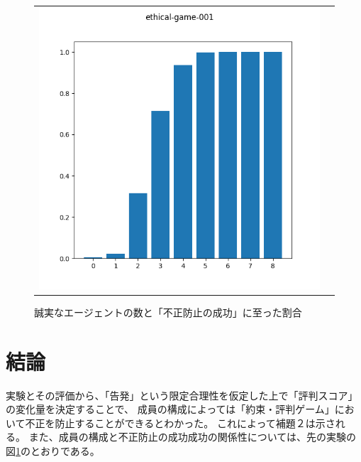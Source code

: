 \begin{figure}[h]
  \begin{tabular}{cc}
    \begin{minipage}[t]{1\hsize}
      \centering
      \includegraphics[keepaspectratio, width=1\linewidth]{./06_ethical-prgame/ethical-game-001.png}
      \caption{誠実なエージェントの数と「不正防止の成功」に至った割合}
      \label{ethical-game-001}
    \end{minipage}
  \end{tabular}
\end{figure}

\section{結論}
実験とその評価から、「告発」という限定合理性を仮定した上で「評判スコア」の変化量を決定することで、
成員の構成によっては「約束・評判ゲーム」において不正を防止することができるとわかった。
これによって補題２は示される。
また、成員の構成と不正防止の成功成功の関係性については、先の実験の図\ref{ethical-game-001}のとおりである。
